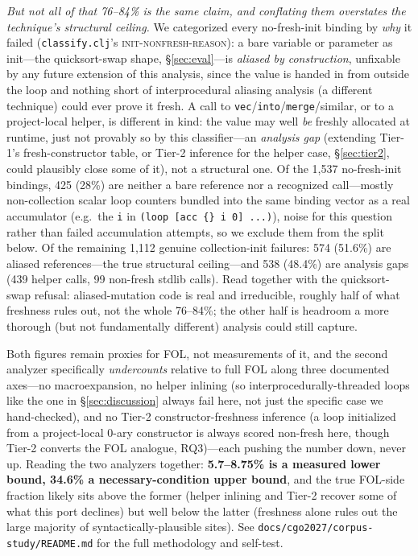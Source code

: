 \documentclass[sigplan,review,anonymous]{acmart}
\begin{document}
\emph{But not all of that 76--84\% is the same claim, and conflating them overstates the technique's structural ceiling.} We categorized every no-fresh-init binding by \emph{why} it failed (\texttt{classify.clj}'s \textsc{init-nonfresh-reason}): a bare variable or parameter as init---the quicksort-swap shape, §\ref{sec:eval}---is \emph{aliased by construction}, unfixable by any future extension of this analysis, since the value is handed in from outside the loop and nothing short of interprocedural aliasing analysis (a different technique) could ever prove it fresh. A call to \texttt{vec}/\texttt{into}/\texttt{merge}/similar, or to a project-local helper, is different in kind: the value may well \emph{be} freshly allocated at runtime, just not provably so by this classifier---an \emph{analysis gap} (extending Tier-1's fresh-constructor table, or Tier-2 inference for the helper case, §\ref{sec:tier2}, could plausibly close some of it), not a structural one. Of the 1{,}537 no-fresh-init bindings, 425 (28\%) are neither a bare reference nor a recognized call---mostly non-collection scalar loop counters bundled into the same binding vector as a real accumulator (e.g.\ the \texttt{i} in \texttt{(loop~[acc~\{\}~i~0]~...)}), noise for this question rather than failed accumulation attempts, so we exclude them from the split below. Of the remaining 1{,}112 genuine collection-init failures: 574 (51.6\%) are aliased references---the true structural ceiling---and 538 (48.4\%) are analysis gaps (439 helper calls, 99 non-fresh stdlib calls). Read together with the quicksort-swap refusal: aliased-mutation code is real and irreducible, roughly half of what freshness rules out, not the whole 76--84\%; the other half is headroom a more thorough (but not fundamentally different) analysis could still capture.

Both figures remain proxies for FOL, not measurements of it, and the second analyzer specifically \emph{undercounts} relative to full FOL along three documented axes---no macroexpansion, no helper inlining (so interprocedurally-threaded loops like the one in §\ref{sec:discussion} always fail here, not just the specific case we hand-checked), and no Tier-2 constructor-freshness inference (a loop initialized from a project-local 0-ary constructor is always scored non-fresh here, though Tier-2 converts the FOL analogue, RQ3)---each pushing the number down, never up. Reading the two analyzers together: \textbf{5.7--8.75\% is a measured lower bound, 34.6\% a necessary-condition upper bound}, and the true FOL-side fraction likely sits above the former (helper inlining and Tier-2 recover some of what this port declines) but well below the latter (freshness alone rules out the large majority of syntactically-plausible sites). See \texttt{docs/cgo2027/corpus-study/README.md} for the full methodology and self-test.
\end{document}
